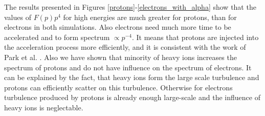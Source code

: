 The results presented in Figures \ref{protons}-\ref{electrons_with_alpha} show that the values of $F(p)p^4$ for high energies are much greater for protons, than for electrons in both simulations. Also electrons need much more time to be accelerated and to form spectrum $\propto p^{-4}$. It means that protons are injected into the acceleration process more efficiently, and it is consistent with the work of Park et al. {\cite{Park2015}}. Also we have shown that minority of heavy ions increases the spectrum of protons and do not have influence on the spectrum of electrons. It can be explained by the fact, that heavy ions form the large scale turbulence and protons can efficiently scatter on this turbulence. Otherwise for electrons turbulence produced by protons is already enough large-scale  and the influence of heavy ions is neglectable. 
